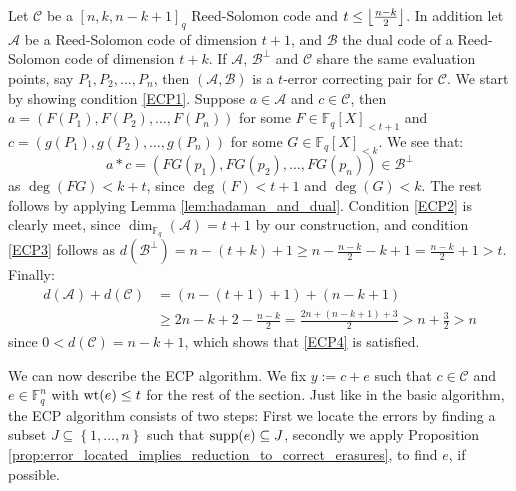 \begin{example}\label{exmp:reed_solomon_ECP}
  Let $\mathcal{C}$ be a $[n, k, n - k + 1]_{q}$ Reed-Solomon code and $t \leq \left\lfloor\frac{n - k}{2}\right\rfloor$. In addition let $\mathcal{A}$ be a Reed-Solomon code of dimension $t + 1$, and $\mathcal{B}$ the dual code of a Reed-Solomon code of dimension $t + k$. If $\mathcal{A}$, $\mathcal{B}^{\perp}$ and $\mathcal{C}$ share the same evaluation points, say $P_1, P_2, \ldots, P_{n}$, then $(\mathcal{A}, \mathcal{B})$ is a $t$-error correcting pair for $\mathcal{C}$. We start by showing condition \ref{ECP1}. Suppose $a \in \mathcal{A}$ and $c \in \mathcal{C}$, then $a = (F(P_1), F(P_2), \ldots, F(P_n))$ for some $F \in \mathbb{F}_q[X]_{< t + 1}$ and $c = (g(P_1), g(P_2), \ldots, g(P_n))$ for some $G \in \mathbb{F}_q[X]_{< k}$. We see that:
  \begin{equation*}
    a * c = (FG(p_1), FG(p_2), \ldots, FG(p_n)) \in \mathcal{B}^{\perp}
  \end{equation*}
  as $\deg(FG) < k + t$, since $\deg(F) < t + 1$ and $\deg(G) < k$. The rest follows by applying Lemma \ref{lem:hadaman_and_dual}. Condition \ref{ECP2} is clearly meet, since $\dim_{\mathbb{F}_q}(\mathcal{A}) = t + 1$ by our construction, and condition \ref{ECP3} follows as $d(\mathcal{B}^{\perp}) = n - (t + k) + 1 \geq n - \frac{n - k}{2} - k + 1 = \frac{n - k}{2} + 1 > t$. Finally:
  \begin{align*}
    d(\mathcal{A}) + d(\mathcal{C}) &= (n - (t + 1) + 1) + (n - k + 1)\\ &\geq 2n - k + 2 - \frac{n - k}{2}  = \frac{2n + (n - k + 1) + 3}{2} > n + \frac{3}{2} > n
  \end{align*}
  since $0 < d(\mathcal{C}) = n - k + 1$, which shows that \ref{ECP4} is satisfied.
\end{example}

We can now describe the ECP algorithm. We fix $y := c + e$ such that $c \in \mathcal{C}$ and $e \in \mathbb{F}_q^n$ with $\mathrm{wt}(e) \leq t$ for the rest of the section.
Just like in the basic algorithm, the ECP algorithm consists of two steps: First we locate the errors by finding a subset $J \subseteq \left\{1, \ldots, n\right\}$ such that $\textnormal{supp}(e) \subseteq J$, secondly we apply Proposition \ref{prop:error_located_implies_reduction_to_correct_erasures}, to find $e$, if possible.


